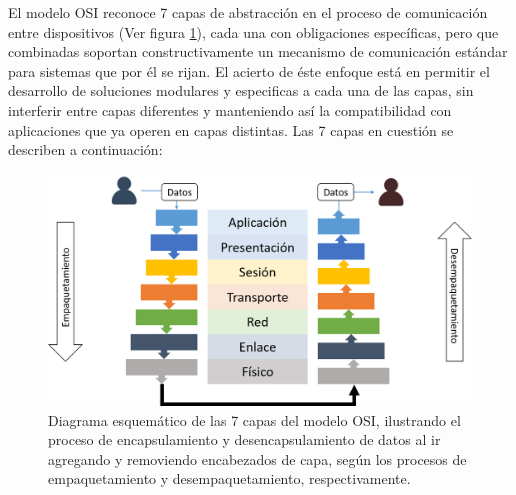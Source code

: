 El modelo OSI reconoce 7 capas de abstracción en el proceso de comunicación entre dispositivos (Ver figura \ref{fig:osi7capas}), cada una con obligaciones específicas, pero que combinadas soportan constructivamente un mecanismo de comunicación estándar para sistemas que por él se rijan. El acierto de éste enfoque está en permitir el desarrollo de soluciones modulares y especificas a cada una de las capas, sin interferir entre capas diferentes y manteniendo así la compatibilidad con aplicaciones que ya operen en capas distintas. Las 7 capas en cuestión se describen a continuación:

\begin{figure}[!h]
	\centering
	\includegraphics[scale=.45]{imagenes/OSI7Capas.png}
	\caption{Diagrama esquemático de las 7 capas del modelo OSI, ilustrando el proceso de encapsulamiento y desencapsulamiento de datos al ir agregando y removiendo encabezados de capa, según los procesos de empaquetamiento y desempaquetamiento, respectivamente.}
	\label{fig:osi7capas}
\end{figure}

